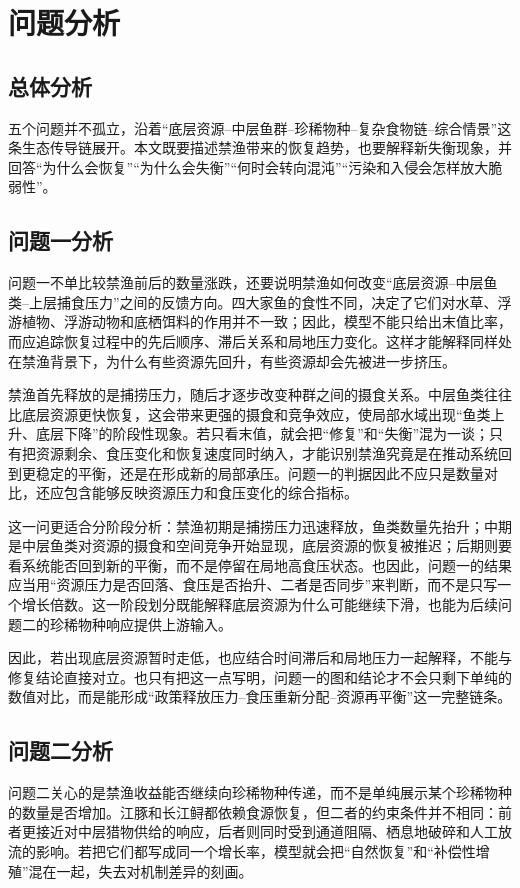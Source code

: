 \section{问题分析}
\subsection{总体分析}
五个问题并不孤立，沿着“底层资源--中层鱼群--珍稀物种--复杂食物链--综合情景”这条生态传导链展开。本文既要描述禁渔带来的恢复趋势，也要解释新失衡现象，并回答“为什么会恢复”“为什么会失衡”“何时会转向混沌”“污染和入侵会怎样放大脆弱性”。

\subsection{问题一分析}
问题一不单比较禁渔前后的数量涨跌，还要说明禁渔如何改变“底层资源--中层鱼类--上层捕食压力”之间的反馈方向。四大家鱼的食性不同，决定了它们对水草、浮游植物、浮游动物和底栖饵料的作用并不一致；因此，模型不能只给出末值比率，而应追踪恢复过程中的先后顺序、滞后关系和局地压力变化。这样才能解释同样处在禁渔背景下，为什么有些资源先回升，有些资源却会先被进一步挤压。

禁渔首先释放的是捕捞压力，随后才逐步改变种群之间的摄食关系。中层鱼类往往比底层资源更快恢复，这会带来更强的摄食和竞争效应，使局部水域出现“鱼类上升、底层下降”的阶段性现象。若只看末值，就会把“修复”和“失衡”混为一谈；只有把资源剩余、食压变化和恢复速度同时纳入，才能识别禁渔究竟是在推动系统回到更稳定的平衡，还是在形成新的局部承压。问题一的判据因此不应只是数量对比，还应包含能够反映资源压力和食压变化的综合指标。

这一问更适合分阶段分析：禁渔初期是捕捞压力迅速释放，鱼类数量先抬升；中期是中层鱼类对资源的摄食和空间竞争开始显现，底层资源的恢复被推迟；后期则要看系统能否回到新的平衡，而不是停留在局地高食压状态。也因此，问题一的结果应当用“资源压力是否回落、食压是否抬升、二者是否同步”来判断，而不是只写一个增长倍数。这一阶段划分既能解释底层资源为什么可能继续下滑，也能为后续问题二的珍稀物种响应提供上游输入。

因此，若出现底层资源暂时走低，也应结合时间滞后和局地压力一起解释，不能与修复结论直接对立。也只有把这一点写明，问题一的图和结论才不会只剩下单纯的数值对比，而是能形成“政策释放压力--食压重新分配--资源再平衡”这一完整链条。

\subsection{问题二分析}
问题二关心的是禁渔收益能否继续向珍稀物种传递，而不是单纯展示某个珍稀物种的数量是否增加。江豚和长江鲟都依赖食源恢复，但二者的约束条件并不相同：前者更接近对中层猎物供给的响应，后者则同时受到通道阻隔、栖息地破碎和人工放流的影响。若把它们都写成同一个增长率，模型就会把“自然恢复”和“补偿性增殖”混在一起，失去对机制差异的刻画。


